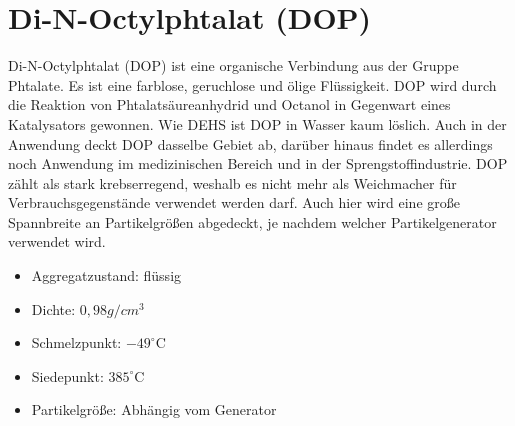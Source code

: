 \section{Di-N-Octylphtalat (DOP)}
Di-N-Octylphtalat (DOP) ist eine organische Verbindung aus der Gruppe Phtalate. Es ist eine farblose, geruchlose und \"{o}lige Fl\"{u}ssigkeit. DOP wird durch die Reaktion von Phtalats\"{a}ureanhydrid und Octanol in Gegenwart eines Katalysators gewonnen. Wie DEHS ist DOP in Wasser kaum l\"{o}slich. Auch in der Anwendung deckt DOP dasselbe Gebiet ab, dar\"{u}ber hinaus findet es allerdings noch Anwendung im medizinischen Bereich und in der Sprengstoffindustrie. DOP z\"{a}hlt als stark krebserregend, weshalb es nicht mehr als Weichmacher f\"{u}r Verbrauchsgegenst\"{a}nde verwendet werden darf. Auch hier wird eine gro{\ss}e Spannbreite an Partikelgr\"{o}{\ss}en abgedeckt, je nachdem welcher Partikelgenerator verwendet wird.
\begin{itemize}
\item Aggregatzustand: fl\"{u}ssig
\item Dichte: \(0,98 g/cm^3\)
\item Schmelzpunkt: \(-49^\circ\text{C}\)
\item Siedepunkt: \(385^\circ\text{C}\)
\item Partikelgr\"{o}{\ss}e: Abh\"{a}ngig vom Generator
\end{itemize}